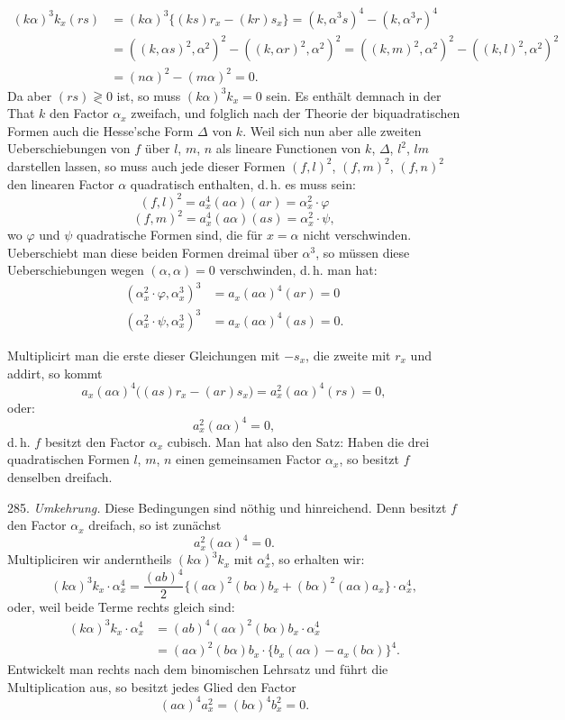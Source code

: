 \documentclass[11pt]{article}
\providecommand{\weq}[2]{\begin{equation}\tag{#1}#2\end{equation}}
\begin{document}
\[
\begin{aligned}
(k\alpha)^3k_x(rs) &= (k\alpha)^3\{(ks)r_x-(kr)s_x\} = (k,\alpha^3s)^4-(k,\alpha^3r)^4\\
&= ((k,\alpha s)^2,\alpha^2)^2-((k,\alpha r)^2,\alpha^2)^2=((k,m)^2,\alpha^2)^2-((k,l)^2,\alpha^2)^2\\
&= (n\alpha)^2-(m\alpha)^2=0.
\end{aligned}
\]
Da aber $(rs)\gtrless 0$ ist, so muss $(k\alpha)^3k_x=0$ sein. Es enthält demnach in der That $k$ den Factor $\alpha_x$ zweifach, und folglich nach der Theorie der biquadratischen Formen auch die Hesse'sche Form $\varDelta$ von $k$. Weil sich nun aber alle zweiten Ueberschiebungen von $f$ über $l$, $m$, $n$ als lineare Functionen von $k$, $\varDelta$, $l^2$, $lm$ darstellen lassen, so muss auch jede dieser Formen $(f,l)^2$, $(f,m)^2$, $(f,n)^2$ den linearen Factor $\alpha$ quadratisch enthalten, d.\,h. es muss sein:
\weq{5}{(f,l)^2=a_x^4(a\alpha)(ar)=\alpha_x^2\cdot\varphi}
\weq{6}{(f,m)^2=a_x^4(a\alpha)(as)=\alpha_x^2\cdot\psi,}
wo $\varphi$ und $\psi$ quadratische Formen sind, die für $x=\alpha$ nicht verschwinden. Ueberschiebt man diese beiden Formen dreimal über $\alpha^3$, so müssen diese Ueberschiebungen wegen $(\alpha,\alpha)=0$ verschwinden, d.\,h. man hat:
\[
\begin{aligned}
(\alpha_x^2\cdot\varphi,\alpha_x^3)^3&=a_x(a\alpha)^4(ar)=0\\
(\alpha_x^2\cdot\psi,\alpha_x^3)^3&=a_x(a\alpha)^4(as)=0.
\end{aligned}
\]

Multiplicirt man die erste dieser Gleichungen mit $-s_x$, die zweite mit $r_x$ und addirt, so kommt
\[
a_x(a\alpha)^4\big((as)r_x-(ar)s_x\big)=a_x^2(a\alpha)^4(rs)=0,
\]
oder:
\[
a_x^2(a\alpha)^4=0,
\]
d.\,h. $f$ besitzt den Factor $\alpha_x$ cubisch. Man hat also den Satz:
\glqq Haben die drei quadratischen Formen $l$, $m$, $n$ einen gemeinsamen Factor $\alpha_x$, so besitzt $f$ denselben dreifach.\grqq{}

285. \textit{Umkehrung.} Diese Bedingungen sind nöthig und hinreichend.
Denn besitzt $f$ den Factor $\alpha_x$ dreifach, so ist zunächst
\[
a_x^2(a\alpha)^4=0.
\]
Multipliciren wir anderntheils $(k\alpha)^3k_x$ mit $\alpha_x^4$, so erhalten wir:
\[
(k\alpha)^3k_x\cdot\alpha_x^4=\frac{(ab)^4}{2}\{(a\alpha)^2(b\alpha)b_x+(b\alpha)^2(a\alpha)a_x\}\cdot\alpha_x^4,
\]
oder, weil beide Terme rechts gleich sind:
\[
\begin{aligned}
(k\alpha)^3k_x\cdot\alpha_x^4&=(ab)^4(a\alpha)^2(b\alpha)b_x\cdot\alpha_x^4\\
&=(a\alpha)^2(b\alpha)b_x\cdot\{b_x(a\alpha)-a_x(b\alpha)\}^4.
\end{aligned}
\]
Entwickelt man rechts nach dem binomischen Lehrsatz und führt die Multiplication aus, so besitzt jedes Glied den Factor
\[
(a\alpha)^4a_x^2=(b\alpha)^4b_x^2=0.
\]
\end{document}
